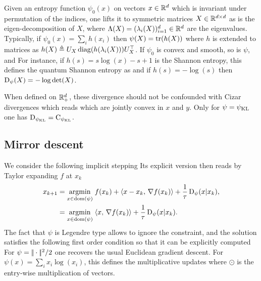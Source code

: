 \begin{rem}
	Given an entropy function $\psi_0(x)$ on vectors $x \in \mathbb{R}^d$ which is invariant under permutation of the indices, one lifts it to symmetric matrices $X \in \mathbb{R}^{d \times d}$ as
	is the eigen-decomposition of $X$, where $\Lambda(X) = (\lambda_i(X))_{i=1}^d \in \mathbb{R}^d$ are the eigenvalues. Typically, if $\psi_0(x)=\sum_i h(x_i)$ then $\psi(X)=\operatorname{tr}(h(X))$ where $h$ is extended to matrices as $h(X) \triangleq U_X \operatorname{diag}(h(\lambda_i(X))) U_X^\top$. If $\psi_0$ is convex and smooth, so is $\psi$, and 
	For instance, if $h(s)=s\log(x)-s+1$ is the Shannon entropy, this defines the quantum Shannon entropy as
	and if $h(s)=-\log(s)$ then $\operatorname{D}_\psi(X)=-\log\det(X)$.
\end{rem}

\begin{rem}
When defined on $\mathbb{R}_+^d$, these divergence should not be confounded with Cizar divergences which reads
which are jointly convex in $x$ and $y$. 
%
Only for $\psi=\psi_{\operatorname{KL}}$ one has $\operatorname{D}_{\psi_{\operatorname{KL}}} = \text{C}_{\psi_{\operatorname{KL}}}$. 
\end{rem}

\subsection{Mirror descent}

We consider the following implicit stepping 
Its explicit version then reads by Taylor expanding $f$ at $x_k$
\begin{align*}
     x_{k+1} &= \underset{x \in \operatorname{dom}(\psi)}{\operatorname{argmin}}\; f(x_k) + \langle x-x_k,\,\nabla f(x_k)\rangle + \frac{1}{\tau} \operatorname{D}_\psi(x|x_k), \\
     	&= \underset{x \in \operatorname{dom}(\psi)}{\operatorname{argmin}}\; \langle x,\,\nabla f(x_k)\rangle + \frac{1}{\tau} \operatorname{D}_\psi(x|x_k).
\end{align*}
The fact that $\psi$ is Legendre type allows to ignore the constraint, and the solution satisfies the following first order condition
so that it can be explicitly computed      
For $\psi=|\!| \cdot |\!|^2/2$ one recovers the usual Euclidean gradient descent.
%
For $\psi(x)=\sum_i x_i \log(x_i)$, this defines the multiplicative updates
where $\odot$ is the entry-wise multiplication of vectors.

